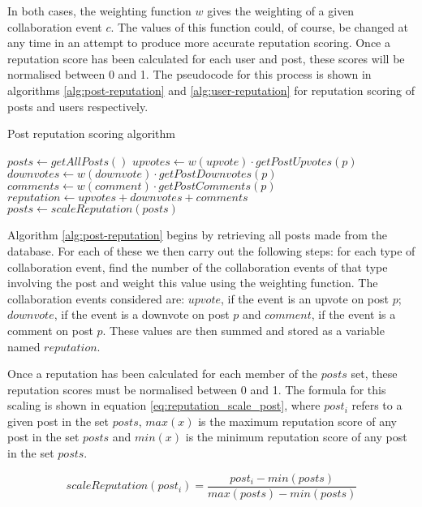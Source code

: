 \noindent
In both cases, the weighting function \(w\) gives the weighting of a given collaboration event \(c\). The values of this function could, of course, be changed at any time in an attempt to produce more accurate reputation scoring. Once a reputation score has been calculated for each user and post, these scores will be normalised between 0 and 1. The pseudocode for this process is shown in algorithms \ref{alg:post-reputation} and \ref{alg:user-reputation} for reputation scoring of posts and users respectively.

\begin{algorithm}[H]
\caption{Post reputation scoring algorithm}
\label{alg:post-reputation}
\begin{algorithmic}[1]
\State $posts\gets getAllPosts()$
	\State $upvotes\gets w(upvote)\cdot getPostUpvotes(p)$
	\State $downvotes\gets w(downvote)\cdot getPostDownvotes(p)$
	\State $comments\gets w(comment)\cdot getPostComments(p)$
	\State $reputation\gets upvotes + downvotes + comments$
\EndFor
\State $posts\gets scaleReputation(posts)$
\end{algorithmic}
\end{algorithm}

\noindent
Algorithm \ref{alg:post-reputation} begins by retrieving all posts made from the database. For each of these we then carry out the following steps: for each type of collaboration event, find the number of the collaboration events of that type involving the post and weight this value using the weighting function. The collaboration events considered are: \(upvote\), if the event is an upvote on post \(p\); \(downvote\), if the event is a downvote on post \(p\) and \(comment\), if the event is a comment on post \(p\). These values are then summed and stored as a variable named \(reputation\).

Once a reputation has been calculated for each member of the \(posts\) set, these reputation scores must be normalised between 0 and 1. The formula for this scaling is shown in equation \ref{eq:reputation_scale_post}, where $post_i$ refers to a given post in the set \(posts\), \(max(x)\) is the maximum reputation score of any post in the set \(posts\) and $min(x)$ is the minimum reputation score of any post in the set \(posts\).

\begin{equation}
	\label{eq:reputation_scale_post}
	scaleReputation(post_i) = \frac{post_i - min(posts)}{max(posts) - min(posts)}
\end{equation}

